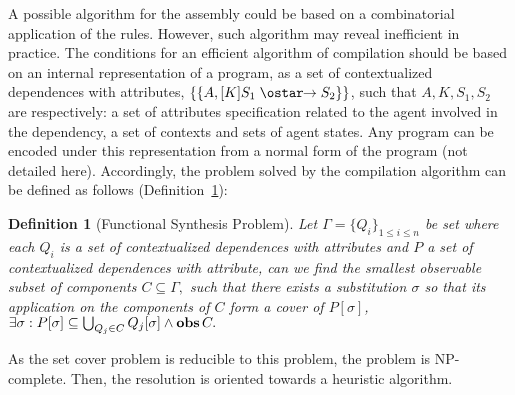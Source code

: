 \documentclass{eptcs}
\newtheorem{definition}{Definition}
\newcommand{\ie}[0]{\abbrev{\textit{i.e.}}}
\newcounter{ti}
\begin{document}
A possible algorithm for the assembly could be based on a combinatorial application of the rules. However, such algorithm may reveal inefficient in practice. The conditions for an efficient algorithm of compilation should be based on an internal representation of a program, as a set of contextualized dependences with attributes, $\{ \{A,[K] S_1 \allcause S_2\} \}$, such that $A,K,S_1,S_2$ are respectively: a set of attributes specification related to the agent involved in the dependency, a set of contexts and sets of agent states. Any program can be encoded under this representation from a normal form of the program (not detailed here). Accordingly, the problem solved by the compilation algorithm can be defined as follows (Definition~\ref{def:probasm}):
\begin{definition}[Functional Synthesis Problem]
\label{def:probasm}
Let $\Gamma=\{Q_i\}_{1 \leq i \leq n}$ be set where each $Q_i$ is a set of contextualized dependences with attributes and $P$ a set of contextualized dependences with attribute, can we find the smallest observable subset of components $C\subseteq \Gamma,$ such that there exists a substitution $\sigma$ so that its application on the components of $C$ form a cover of $P[\sigma]$,\ie
$\exists \sigma: P[\sigma] \subseteq \bigcup_{Q_j \in C} Q_j[\sigma] \land \textbf{obs}\, C.$
\end{definition}
As the set cover problem is reducible to this problem, the problem is NP-complete. Then, the resolution is oriented towards a heuristic algorithm. 
\end{document}

